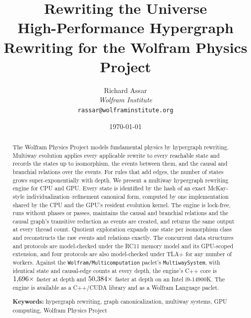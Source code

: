 \documentclass[9pt,twocolumn,a4paper]{extarticle}
\begin{document}

\title{\textbf{Rewriting the Universe}\\[0.4em]
{\normalsize\normalfont High-Performance Hypergraph Rewriting for the Wolfram Physics Project}}

\author{
    Richard Assar\\
    \textit{Wolfram Institute}\\
    \texttt{rassar@wolframinstitute.org}
}

\date{\today}

\maketitle


\begin{abstract}
The Wolfram Physics Project models fundamental physics by hypergraph rewriting. Multiway
evolution applies every applicable rewrite to every reachable state and records the states up to
isomorphism, the events between them, and the causal and branchial relations over the events.
For rules that add edges, the number of states grows super-exponentially with depth. We present a
multiway hypergraph rewriting engine for CPU and GPU. Every state is identified by the hash of an exact
McKay-style individualization--refinement canonical form, computed by one implementation shared
by the CPU and the GPU's resident evolution kernel. The engine is lock-free, runs without phases
or passes, maintains the causal and branchial relations and the causal graph's transitive
reduction as events are created, and returns the same output at every thread count. Quotient
exploration expands one state per isomorphism class and reconstructs the raw events and relations
exactly. The concurrent data structures and protocols are model-checked under the RC11 memory
model and its GPU-scoped extension, and four protocols are also model-checked under TLA+ for any
number of workers.
Against the \texttt{Wolfram/\allowbreak Multicomputation} paclet's \texttt{MultiwaySystem},
with identical state and causal-edge counts at every depth, the engine's C++ core is
$1{,}696\times$ faster at depth \SpeedupLowDepth{} and $50{,}384\times$
faster at depth \SpeedupHighDepth{} on an Intel i9-14900K. The engine is available as a C++/CUDA
library and as a Wolfram Language paclet.

\vspace{1em}
\noindent\parbox{\linewidth}{\textbf{Keywords:} hypergraph rewriting, graph canonicalization,
multiway systems, GPU computing, Wolfram Physics Project}
\end{abstract}
\end{document}
